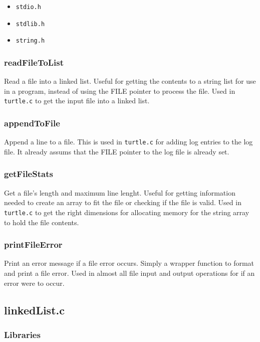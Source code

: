 \documentclass[a4paper, 12pt, titlepage]{article}
\newcommand{\code}[1]{\small\texttt{#1}\normalsize}
\begin{document}
\begin{itemize}[label={--}, noitemsep]
    \item \code{stdio.h}
    \item \code{stdlib.h}
    \item \code{string.h}
\end{itemize}

\subsubsection{readFileToList}

Read a file into a linked list. Useful for getting the contents to a string 
list for use in a program, instead of using the FILE pointer to process 
the file. Used in \code{turtle.c} to get the input file into a linked list.

\subsubsection{appendToFile}

Append a line to a file. This is used in \code{turtle.c} for adding log 
entries to the log file. It already assums that the FILE pointer to the 
log file is already set.

\subsubsection{getFileStats}

Get a file's length and maximum line lenght. Useful for getting information 
needed to create an array to fit the file or checking if the file is valid. 
Used in \code{turtle.c} to get the right dimensions for allocating memory 
for the string array to hold the file contents.

\subsubsection{printFileError}

Print an error message if a file error occurs. Simply a wrapper function to 
format and print a file error. Used in almost all file input and output 
operations for if an error were to occur.

\pagebreak
\subsection{linkedList.c}
\subsubsection{Libraries}
\end{document}
